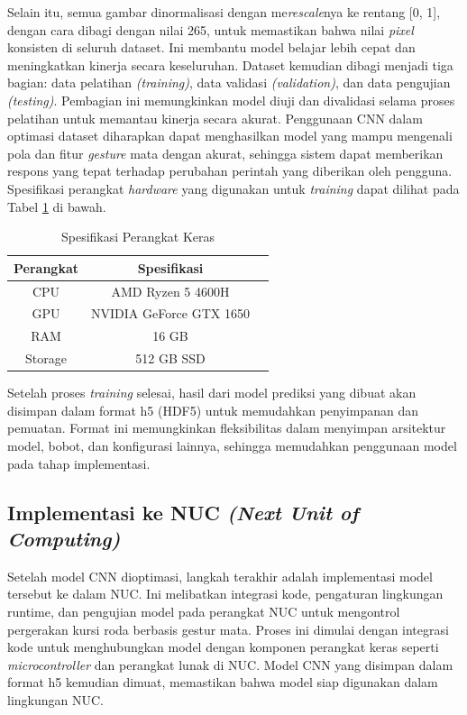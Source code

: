 Selain itu, semua gambar dinormalisasi dengan me\emph{rescale}nya ke rentang [0, 1], dengan cara dibagi dengan nilai 265, untuk memastikan bahwa nilai \emph{pixel} konsisten di seluruh dataset. Ini membantu model belajar lebih cepat dan meningkatkan kinerja secara keseluruhan. Dataset kemudian dibagi menjadi tiga bagian: data pelatihan \emph{(training)}, data validasi \emph{(validation)}, dan data pengujian \emph{(testing)}. Pembagian ini memungkinkan model diuji dan divalidasi selama proses pelatihan untuk memantau kinerja secara akurat. Penggunaan CNN dalam optimasi dataset diharapkan dapat menghasilkan model yang mampu mengenali pola dan fitur \emph{gesture} mata dengan akurat, sehingga sistem dapat memberikan respons yang tepat terhadap perubahan perintah yang diberikan oleh pengguna. Spesifikasi perangkat \emph{hardware} yang digunakan untuk \emph{training} dapat dilihat pada Tabel \ref{tb:speklaptop} di bawah.

\begin{longtable}{|c|c|c|}
  \caption{Spesifikasi Perangkat Keras}
  \label{tb:speklaptop} \\
  \hline
  \rowcolor[HTML]{C0C0C0}
  \textbf{Perangkat}        & \textbf{Spesifikasi}    \\ \hline
  \multicolumn{1}{|c|}{CPU} & AMD Ryzen 5 4600H       \\ \hline
  \multicolumn{1}{|c|}{GPU} & NVIDIA GeForce GTX 1650 \\ \hline
  RAM                       & 16 GB                   \\ \hline
  Storage                   & 512 GB SSD              \\ \hline
\end{longtable}

Setelah proses \emph{training} selesai, hasil dari model prediksi yang dibuat akan disimpan dalam format h5 (HDF5) untuk memudahkan penyimpanan dan pemuatan. Format ini memungkinkan fleksibilitas dalam menyimpan arsitektur model, bobot, dan konfigurasi lainnya, sehingga memudahkan penggunaan model pada tahap implementasi.

\subsection{Implementasi ke NUC \textit{(Next Unit of Computing)}}

Setelah model CNN dioptimasi, langkah terakhir adalah implementasi model tersebut ke dalam NUC. Ini melibatkan integrasi kode, pengaturan lingkungan runtime, dan pengujian model pada perangkat NUC untuk mengontrol pergerakan kursi roda berbasis gestur mata. Proses ini dimulai dengan integrasi kode untuk menghubungkan model dengan komponen perangkat keras seperti \emph{microcontroller} dan perangkat lunak di NUC. Model CNN yang disimpan dalam format h5 kemudian dimuat, memastikan bahwa model siap digunakan dalam lingkungan NUC.

